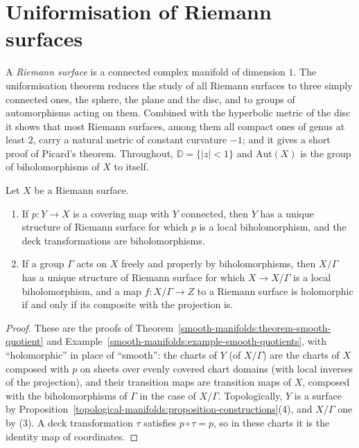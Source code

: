 \section{Uniformisation of Riemann surfaces}\label{complex-manifolds:section-uniformisation}

A \emph{Riemann surface} is a connected complex manifold of dimension $1$. The uniformisation theorem reduces the study of all Riemann surfaces to three simply connected
ones, the sphere, the plane and the disc, and to groups of automorphisms acting on them. Combined with the hyperbolic metric of the disc it shows that most Riemann surfaces,
among them all compact ones of genus at least $2$, carry a natural metric of constant curvature $-1$; and it gives a short proof of Picard's theorem. Throughout,
$\mathbb{D} = \{|z| < 1\}$ and $\mathrm{Aut}(X)$ is the group of biholomorphisms of $X$ to itself.

\begin{lemma}\label{complex-manifolds:lemma-coverings}
Let $X$ be a Riemann surface.
\begin{enumerate}
\item If $p \colon Y \to X$ is a covering map with $Y$ connected, then $Y$ has a unique structure of Riemann surface for which $p$ is a local biholomorphism, and the deck
transformations are biholomorphisms.
\item If a group $\Gamma$ acts on $X$ freely and properly by biholomorphisms, then $X/\Gamma$ has a unique structure of Riemann surface for which $X \to X/\Gamma$ is a local
biholomorphism, and a map $f \colon X/\Gamma \to Z$ to a Riemann surface is holomorphic if and only if its composite with the projection is.
\end{enumerate}
\end{lemma}

\begin{proof}
These are the proofs of Theorem~\ref{smooth-manifolds:theorem-smooth-quotient} and Example~\ref{smooth-manifolds:example-smooth-quotients}, with ``holomorphic'' in place of
``smooth'': the charts of $Y$ (of $X/\Gamma$) are the charts of $X$ composed with $p$ on sheets over evenly covered chart domains (with local inverses of the projection), and their
transition maps are transition maps of $X$, composed with the biholomorphisms of $\Gamma$ in the case of $X/\Gamma$. Topologically, $Y$ is a surface by
Proposition~\ref{topological-manifolds:proposition-constructions}(4), and $X/\Gamma$ one by (3). A deck transformation $\tau$ satisfies $p \circ \tau = p$, so in these charts it is
the identity map of coordinates.
\end{proof}

